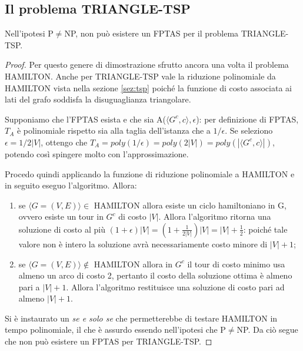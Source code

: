 \subsection{Il problema TRIANGLE-TSP}
\begin{proposizione}
Nell'ipotesi P$\neq$NP, non può esistere un FPTAS per il problema TRIANGLE-TSP.
\end{proposizione}
\begin{proof}
Per questo genere di dimostrazione sfrutto ancora una volta il problema HAMILTON. Anche per TRIANGLE-TSP vale la riduzione polinomiale da HAMILTON vista nella sezione \ref{sez:tsp} poiché la funzione di costo associata ai lati del grafo soddisfa la disuguaglianza triangolare.

Supponiamo che l'FPTAS esista e che sia A($\langle G^c,c\rangle,\epsilon$): per definizione di FPTAS, $T_A$ è polinomiale rispetto sia alla taglia dell'istanza che a $1/\epsilon$. Se seleziono $\epsilon=1/2|V|$, ottengo che $T_A=poly(1/\epsilon)=poly(2|V|)=poly(|\langle G^c,c\rangle|)$, potendo così spingere molto con l'approssimazione.

Procedo quindi applicando la funzione di riduzione polinomiale a HAMILTON e in seguito eseguo l'algoritmo. Allora:
\begin{enumerate}
\item se $\langle G=(V,E) \rangle\in$ HAMILTON allora esiste un ciclo hamiltoniano in G, ovvero esiste un tour in $G^c$ di costo $|V|$. Allora l'algoritmo ritorna una soluzione di costo al più $(1+\epsilon)|V|=(1+\frac{1}{2|V|})|V|=|V|+\frac{1}{2}$: poiché tale valore non è intero la soluzione avrà necessariamente costo minore di $|V|+1$;
\item se $\langle G=(V,E) \rangle\notin$ HAMILTON allora in $G^c$ il tour di costo minimo usa almeno un arco di costo 2, pertanto il costo della soluzione ottima è almeno pari a $|V|+1$. Allora l'algoritmo restituisce una soluzione di costo pari ad almeno $|V|+1$.
\end{enumerate}

Si è instaurato un \textit{se e solo se} che permetterebbe di testare HAMILTON in tempo polinomiale, il che è assurdo essendo nell'ipotesi che P$\neq$NP. Da ciò segue che non può esistere un FPTAS per TRIANGLE-TSP.
\end{proof}

